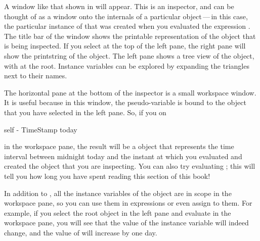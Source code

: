 \documentclass[a4paper,10pt,twoside]{book}
\begin{document}
A window like that shown in  will appear.   
This is an inspector, and can be thought of as a window onto the internals of a particular object\,---\,in this case, the particular instance of \mbox{} 
that was created when you evaluated the expression .
The title bar of the window shows the printable representation of the object that is being inspected.
If you select  at the top of the left pane, the right pane will show the printstring of the object.
The left pane shows a tree view of the object, with \self at the root.
Instance variables can be explored by expanding the triangles next to their names.

The horizontal pane at the bottom of the inspector is a small workspace window.  It is useful because in this window, the pseudo-variable  is bound to the object that you have selected in the left pane.
So, if you  on
\begin{code}{}
self - TimeStamp today
\end{code}
in the workspace pane, the result will be a  object that represents the time interval between midnight today and the instant at which you evaluated   and created the  object that you are inspecting.
You can also try evaluating ; this will tell you how long you have spent reading this section of this book!

In addition to , all the instance variables of the object are in scope in the workspace pane, so you can use them in expressions or even assign to them.  For example, if you select the root object in the left pane and evaluate  in the workspace pane, you will see that the value of the  instance variable will indeed change, and the value of  will increase by one day.

\end{document}
